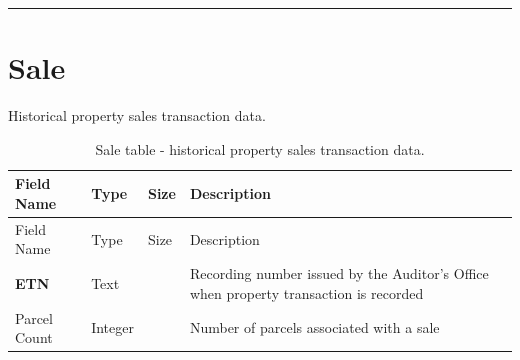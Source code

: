 \documentclass[
  english,
  letterpaper,
  DIV=11,
  numbers=noendperiod]{scrreprt}
\begin{document}
\begin{center}\rule{0.5\linewidth}{0.5pt}\end{center}

\section{Sale}\label{sale-1}

Historical property sales transaction data.

\begin{longtable}[]{@{}
  >{\raggedright\arraybackslash}p{}
  >{\raggedright\arraybackslash}p{}
  >{\raggedright\arraybackslash}p{}
  >{\raggedright\arraybackslash}p{}@{}}
\caption{Sale table - historical property sales transaction
data.}\label{tbl-app-sale}\tabularnewline
\toprule\noalign{}
\begin{minipage}[b]{\linewidth}\raggedright
Field Name
\end{minipage} & \begin{minipage}[b]{\linewidth}\raggedright
Type
\end{minipage} & \begin{minipage}[b]{\linewidth}\raggedright
Size
\end{minipage} & \begin{minipage}[b]{\linewidth}\raggedright
Description
\end{minipage} \\
\midrule\noalign{}
\endfirsthead
\toprule\noalign{}
\begin{minipage}[b]{\linewidth}\raggedright
Field Name
\end{minipage} & \begin{minipage}[b]{\linewidth}\raggedright
Type
\end{minipage} & \begin{minipage}[b]{\linewidth}\raggedright
Size
\end{minipage} & \begin{minipage}[b]{\linewidth}\raggedright
Description
\end{minipage} \\
\midrule\noalign{}
\endhead
\bottomrule\noalign{}
\endlastfoot
\textbf{ETN} & Text & 11 & Recording number issued by the Auditor's
Office when property transaction is recorded \\
Parcel Count & Integer & & Number of parcels associated with a sale \\

\end{longtable}
\end{document}
